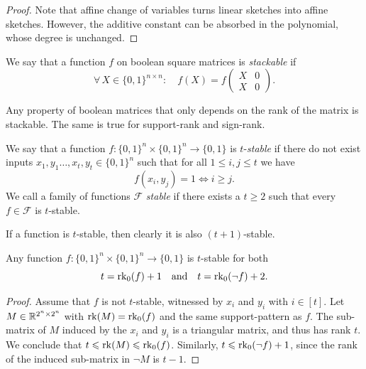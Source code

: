 \documentclass{article}
\begin{document}
\begin{proof}
    Note that affine change of variables turns linear sketches into affine sketches. However, the additive constant can be absorbed in the polynomial, whose degree is unchanged.
\end{proof}

\begin{boxdefinition}[Stackability]
    We say that a function $f$ on boolean square matrices is \emph{stackable} if
    \[
        \forall\, X\in\{0,1\}^{n\times n}\colon\quad
        f(X) = f\left(
        \begin{matrix}
            X & 0 \\
            X & 0      
        \end{matrix}
        \right).
    \]
\end{boxdefinition}

\begin{example}
    Any property of boolean matrices that only depends on the rank of the matrix is stackable. The same is true for support-rank and sign-rank.
\end{example}

\begin{boxdefinition}[Stability]
    We say that a function $f\colon\{0,1\}^n\times \{0,1\}^n\to\{0,1\}$ is $t$-\emph{stable} if there do not exist inputs $x_1,y_1\dots, x_t,y_t\in \{0,1\}^n$ such that for all $1\leq i,j\leq t$ we have
    \[
        f(x_i, y_j) = 1\iff i \geq j.
    \]
    We call a family of functions $\mathcal{F}$ \emph{stable} if there exists a $t\geq 2$ such that every $f\in \mathcal{F}$ is $t$-stable.
\end{boxdefinition}

If a function is $t$-stable, then clearly it is also $(t+1)$-stable.

\begin{boxlemma}\label{lem:stable-supp}
    Any function $f\colon\{0,1\}^n\times \{0,1\}^n\to\{0,1\}$ is $t$-stable for both
    \[
        t = \operatorname{rk}_0(f)+1 \quad\text{and}\quad t = \operatorname{rk}_0(\neg f)+2.
    \]
\end{boxlemma}
\begin{proof}
    Assume that $f$ is not $t$-stable, witnessed by $x_i$ and $y_i$ with $i\in[t]$. Let $M\in\mathbb{R}^{2^n\times 2^n}$ with $\operatorname{rk}(M) = \operatorname{rk}_0(f)$ and the same support-pattern as $f$. The sub-matrix of $M$ induced by the $x_i$ and $y_i$ is a triangular matrix, and thus has rank $t$. We conclude that $t \leqslant \operatorname{rk}(M) \leqslant \operatorname{rk}_0(f)$. Similarly, $t\leqslant \operatorname{rk}_0(\neg f) + 1$, since the rank of the induced sub-matrix in $\neg M$ is $t-1$.
\end{proof}
\end{document}
